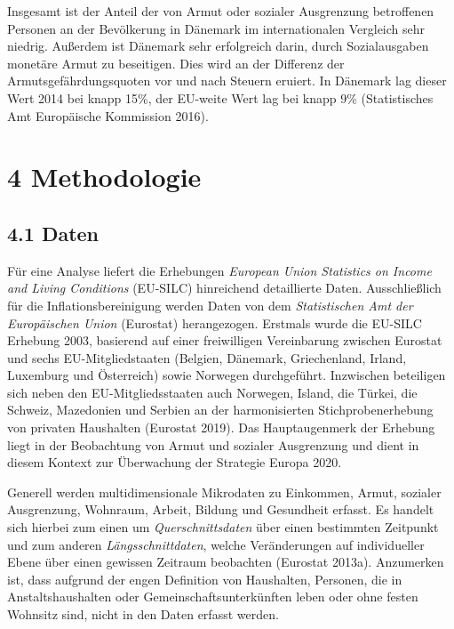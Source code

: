 \documentclass[12pt,]{article}
\begin{document}
Insgesamt ist der Anteil der von Armut oder sozialer Ausgrenzung
betroffenen Personen an der Bevölkerung in Dänemark im internationalen
Vergleich sehr niedrig. Außerdem ist Dänemark sehr erfolgreich darin,
durch Sozialausgaben monetäre Armut zu beseitigen. Dies wird an der
Differenz der Armutsgefährdungsquoten vor und nach Steuern eruiert. In
Dänemark lag dieser Wert 2014 bei knapp 15\%, der EU-weite Wert lag bei
knapp 9\% (Statistisches Amt Europäische Kommission 2016).

\section{4 Methodologie}\label{methodologie}

\subsection{4.1 Daten}\label{daten}

Für eine Analyse liefert die Erhebungen \emph{European Union Statistics
on Income and Living Conditions} (EU-SILC) hinreichend detaillierte
Daten. Ausschließlich für die Inflationsbereinigung werden Daten von dem
\emph{Statistischen Amt der Europäischen Union} (Eurostat) herangezogen.
Erstmals wurde die EU-SILC Erhebung 2003, basierend auf einer
freiwilligen Vereinbarung zwischen Eurostat und sechs EU-Mitgliedstaaten
(Belgien, Dänemark, Griechenland, Irland, Luxemburg und Österreich)
sowie Norwegen durchgeführt. Inzwischen beteiligen sich neben den
EU-Mitgliedsstaaten auch Norwegen, Island, die Türkei, die Schweiz,
Mazedonien und Serbien an der harmonisierten Stichprobenerhebung von
privaten Haushalten (Eurostat 2019). Das Hauptaugenmerk der Erhebung
liegt in der Beobachtung von Armut und sozialer Ausgrenzung und dient in
diesem Kontext zur Überwachung der Strategie Europa 2020.

Generell werden multidimensionale Mikrodaten zu Einkommen, Armut,
sozialer Ausgrenzung, Wohnraum, Arbeit, Bildung und Gesundheit erfasst.
Es handelt sich hierbei zum einen um \emph{Querschnittsdaten} über einen
bestimmten Zeitpunkt und zum anderen \emph{Längsschnittdaten}, welche
Veränderungen auf individueller Ebene über einen gewissen Zeitraum
beobachten (Eurostat 2013a). Anzumerken ist, dass aufgrund der engen
Definition von Haushalten, Personen, die in Anstaltshaushalten oder
Gemeinschaftsunterkünften leben oder ohne festen Wohnsitz sind, nicht in
den Daten erfasst werden.
\end{document}
